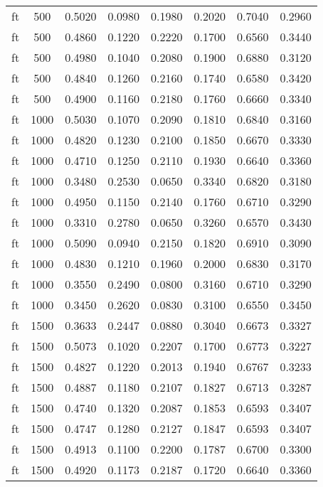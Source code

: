 \begin{scriptsize}
\begin{longtable}{cccccccc}
		ft       & 500  & 0.5020 & 0.0980 & 0.1980 & 0.2020 & 0.7040 & 0.2960 \\
		ft       & 500  & 0.4860 & 0.1220 & 0.2220 & 0.1700 & 0.6560 & 0.3440 \\
		ft       & 500  & 0.4980 & 0.1040 & 0.2080 & 0.1900 & 0.6880 & 0.3120 \\
		ft       & 500  & 0.4840 & 0.1260 & 0.2160 & 0.1740 & 0.6580 & 0.3420 \\
		ft       & 500  & 0.4900 & 0.1160 & 0.2180 & 0.1760 & 0.6660 & 0.3340 \\
		ft       & 1000 & 0.5030 & 0.1070 & 0.2090 & 0.1810 & 0.6840 & 0.3160 \\
		ft       & 1000 & 0.4820 & 0.1230 & 0.2100 & 0.1850 & 0.6670 & 0.3330 \\
		ft       & 1000 & 0.4710 & 0.1250 & 0.2110 & 0.1930 & 0.6640 & 0.3360 \\
		ft       & 1000 & 0.3480 & 0.2530 & 0.0650 & 0.3340 & 0.6820 & 0.3180 \\
		ft       & 1000 & 0.4950 & 0.1150 & 0.2140 & 0.1760 & 0.6710 & 0.3290 \\
		ft       & 1000 & 0.3310 & 0.2780 & 0.0650 & 0.3260 & 0.6570 & 0.3430 \\
		ft       & 1000 & 0.5090 & 0.0940 & 0.2150 & 0.1820 & 0.6910 & 0.3090 \\
		ft       & 1000 & 0.4830 & 0.1210 & 0.1960 & 0.2000 & 0.6830 & 0.3170 \\
		ft       & 1000 & 0.3550 & 0.2490 & 0.0800 & 0.3160 & 0.6710 & 0.3290 \\
		ft       & 1000 & 0.3450 & 0.2620 & 0.0830 & 0.3100 & 0.6550 & 0.3450 \\
		ft       & 1500 & 0.3633 & 0.2447 & 0.0880 & 0.3040 & 0.6673 & 0.3327 \\
		ft       & 1500 & 0.5073 & 0.1020 & 0.2207 & 0.1700 & 0.6773 & 0.3227 \\
		ft       & 1500 & 0.4827 & 0.1220 & 0.2013 & 0.1940 & 0.6767 & 0.3233 \\
		ft       & 1500 & 0.4887 & 0.1180 & 0.2107 & 0.1827 & 0.6713 & 0.3287 \\
		ft       & 1500 & 0.4740 & 0.1320 & 0.2087 & 0.1853 & 0.6593 & 0.3407 \\
		ft       & 1500 & 0.4747 & 0.1280 & 0.2127 & 0.1847 & 0.6593 & 0.3407 \\
		ft       & 1500 & 0.4913 & 0.1100 & 0.2200 & 0.1787 & 0.6700 & 0.3300 \\
		ft       & 1500 & 0.4920 & 0.1173 & 0.2187 & 0.1720 & 0.6640 & 0.3360 \\

\end{longtable}
\end{scriptsize}
